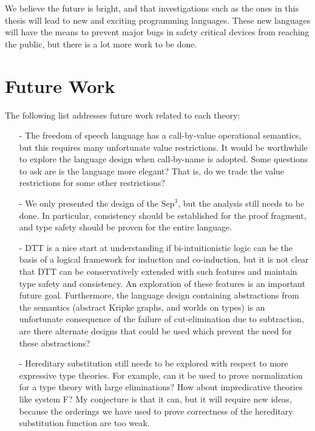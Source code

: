 \documentclass[phd,appendix,dedicationpage,ackpage,epigraphpage]{uithesis}
\newcommand{\Sep}[0]{\text{Sep}^3}
\begin{document}
We believe the future is bright, and that investigations such as the
ones in this thesis will lead to new and exciting programming
languages.  These new languages will have the means to prevent major
bugs in safety critical devices from reaching the public, but there is
a lot more work to be done.

\section{Future Work}
\label{sec:future_work}
The following list addresses future work related to each theory:
\begin{itemize}
\item[-] The freedom of speech language has a call-by-value
  operational semantics, but this requires many unfortunate value
  restrictions.  It would be worthwhile to explore the language design
  when call-by-name is adopted.  Some questions to ask are is the
  language more elegant?  That is, do we trade the value restrictions
  for some other restrictions?

\item[-] We only presented the design of the $\Sep$, but the analysis
  still needs to be done.  In particular, consistency should be
  established for the proof fragment, and type safety should be proven
  for the entire language.

\item[-] DTT is a nice start at understanding if bi-intuitionistic
  logic can be the basis of a logical framework for induction and
  co-induction, but it is not clear that DTT can be conservatively
  extended with such features and maintain type safety and
  consistency.  An exploration of these features is an important
  future goal.  Furthermore, the language design containing
  abstractions from the semantics (abstract Kripke graphs, and worlds
  on types) is an unfortunate consequence of the failure of
  cut-elimination due to subtraction, are there alternate designs that
  could be used which prevent the need for these abstractions?

\item[-] Hereditary substitution still needs to be explored with
  respect to more expressive type theories.  For example, can it be
  used to prove normalization for a type theory with large
  eliminations?  How about impredicative theories like system F?  My
  conjecture is that it can, but it will require new ideas, because
  the orderings we have used to prove correctness of the hereditary
  substitution function are too weak.
\end{itemize}
\end{document}
